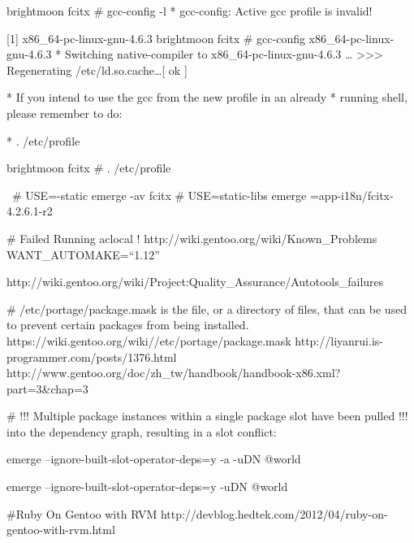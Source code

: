 brightmoon fcitx # gcc-config -l
 * gcc-config: Active gcc profile is invalid!

  [1] x86_64-pc-linux-gnu-4.6.3
  brightmoon fcitx # gcc-config x86_64-pc-linux-gnu-4.6.3
   * Switching native-compiler to x86_64-pc-linux-gnu-4.6.3 \ldots
   >>> Regenerating /etc/ld.so.cache\ldots                                                                                                    [ ok ]

    * If you intend to use the gcc from the new profile in an already
     * running shell, please remember to do:

      *   . /etc/profile

      brightmoon fcitx # . /etc/profile

~# USE=-static emerge -av fcitx
# USE=static-libs emerge =app-i18n/fcitx-4.2.6.1-r2


# Failed Running aclocal !
http://wiki.gentoo.org/wiki/Known_Problems
WANT_AUTOMAKE=``1.12''

http://wiki.gentoo.org/wiki/Project:Quality_Assurance/Autotools_failures



# /etc/portage/package.mask is the file, or a directory of files, that can be used to prevent certain packages from being installed. 
https://wiki.gentoo.org/wiki//etc/portage/package.mask
http://liyanrui.is-programmer.com/posts/1376.html
http://www.gentoo.org/doc/zh_tw/handbook/handbook-x86.xml?part=3&chap=3



# !!! Multiple package instances within a single package slot have been pulled
!!! into the dependency graph, resulting in a slot conflict:


emerge --ignore-built-slot-operator-deps=y -a -uDN @world 


emerge --ignore-built-slot-operator-deps=y -uDN @world


#Ruby On Gentoo with RVM 
http://devblog.hedtek.com/2012/04/ruby-on-gentoo-with-rvm.html
